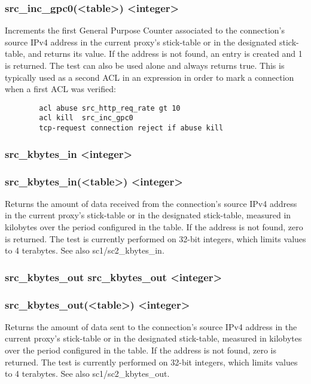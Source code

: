 \subsubsection{src\_inc\_gpc0(<table>) <integer>}
  Increments the first General Purpose Counter associated to the connection's
  source IPv4 address in the current proxy's stick-table or in the designated
  stick-table, and returns its value. If the address is not found, an entry is
  created and 1 is returned. The test can also be used alone and always returns
  true. This is typically used as a second ACL in an expression in order to
  mark a connection when a first ACL was verified:
  \begin{verbatim}
        acl abuse src_http_req_rate gt 10
        acl kill  src_inc_gpc0
        tcp-request connection reject if abuse kill
  \end{verbatim}

\subsubsection[src\_kbytes\_in]{src\_kbytes\_in <integer>}
\subsubsection*{src\_kbytes\_in(<table>) <integer>}
  Returns the amount of data received from the connection's source IPv4 address
  in the current proxy's stick-table or in the designated stick-table, measured
  in kilobytes over the period configured in the table. If the address is not
  found, zero is returned. The test is currently performed on 32-bit integers,
  which limits values to 4 terabytes. See also sc1/sc2\_kbytes\_in.

\subsubsection[src\_kbytes\_out]{src\_kbytes\_out src\_kbytes\_out <integer>}
\subsubsection*{src\_kbytes\_out(<table>) <integer>}
  Returns the amount of data sent to the connection's source IPv4 address in
  the current proxy's stick-table or in the designated stick-table, measured
  in kilobytes over the period configured in the table. If the address is not
  found, zero is returned. The test is currently performed on 32-bit integers,
  which limits values to 4 terabytes. See also sc1/sc2\_kbytes\_out.

